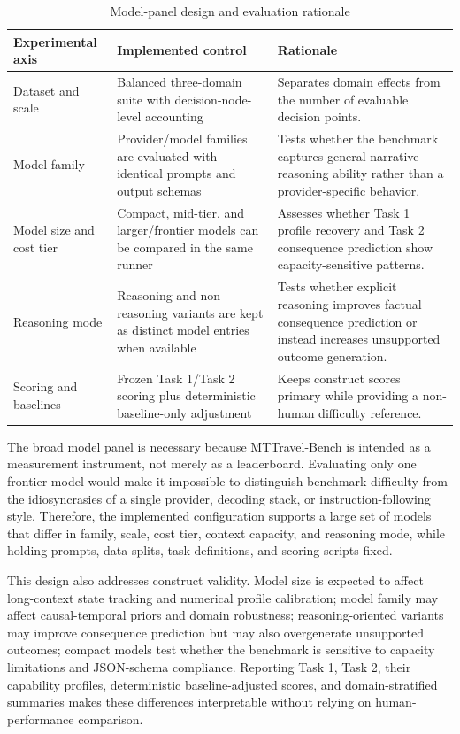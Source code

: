 \documentclass[pdflatex,sn-mathphys-num]{sn-jnl}%
\theoremstyle{thmstyleone}%
\theoremstyle{thmstyletwo}%
\theoremstyle{thmstylethree}%
\begin{document}
\begin{table}[htbp]
\centering
\small
\caption{Model-panel design and evaluation rationale}
\label{tab:model-panel-design-and-evaluation-ration}
\begin{tabular}{p{}p{}p{}}
\toprule
Experimental axis & Implemented control & Rationale \\
\midrule
Dataset and scale & Balanced three-domain suite with decision-node-level accounting & Separates domain effects from the number of evaluable decision points. \\
Model family & Provider/model families are evaluated with identical prompts and output schemas & Tests whether the benchmark captures general narrative-reasoning ability rather than a provider-specific behavior. \\
Model size and cost tier & Compact, mid-tier, and larger/frontier models can be compared in the same runner & Assesses whether Task 1 profile recovery and Task 2 consequence prediction show capacity-sensitive patterns. \\
Reasoning mode & Reasoning and non-reasoning variants are kept as distinct model entries when available & Tests whether explicit reasoning improves factual consequence prediction or instead increases unsupported outcome generation. \\
Scoring and baselines & Frozen Task 1/Task 2 scoring plus deterministic baseline-only adjustment & Keeps construct scores primary while providing a non-human difficulty reference. \\
\bottomrule
\end{tabular}
\end{table}

The broad model panel is necessary because MTTravel-Bench is intended as a measurement instrument, not merely as a leaderboard. Evaluating only one frontier model would make it impossible to distinguish benchmark difficulty from the idiosyncrasies of a single provider, decoding stack, or instruction-following style. Therefore, the implemented configuration supports a large set of models that differ in family, scale, cost tier, context capacity, and reasoning mode, while holding prompts, data splits, task definitions, and scoring scripts fixed.

This design also addresses construct validity. Model size is expected to affect long-context state tracking and numerical profile calibration; model family may affect causal-temporal priors and domain robustness; reasoning-oriented variants may improve consequence prediction but may also overgenerate unsupported outcomes; compact models test whether the benchmark is sensitive to capacity limitations and JSON-schema compliance. Reporting Task 1, Task 2, their capability profiles, deterministic baseline-adjusted scores, and domain-stratified summaries makes these differences interpretable without relying on human-performance comparison.
\end{document}
